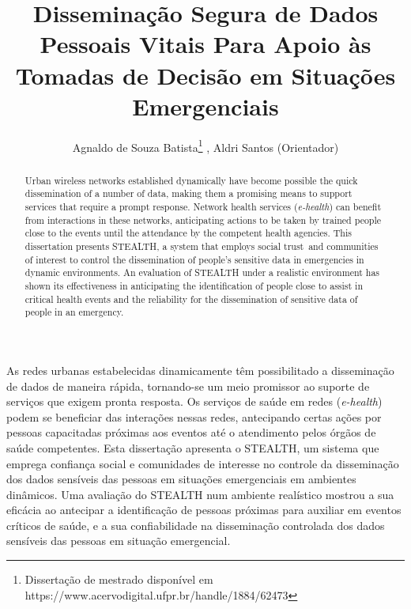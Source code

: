 \documentclass[12pt]{article}
\title{Disseminação Segura de Dados Pessoais Vitais Para Apoio às Tomadas de Decisão em Situações Emergenciais}
\author{Agnaldo de Souza Batista\inst{1}\thanks{{Dissertação de mestrado disponível em https://www.acervodigital.ufpr.br/handle/1884/62473}}\,\,, Aldri Santos\inst{1} (Orientador)}
\newcommand{\agn}[1]{\textcolor{auburn}{#1}}
\begin{document}
 
\pagestyle{myheadings} %
\maketitle

\begin{abstract}
Urban wireless networks established dynamically have become possible the quick dissemination of a number of data, making them a promising means to support services that require a prompt response. Network health services (\textit{e-health})
can benefit from interactions in these networks, 
anticipating
actions to be taken by trained people close to the events until the attendance by the competent health agencies. This dissertation presents \mbox{STEALTH}, a system that employs social trust~and communities of interest to control the dissemination of people's sensitive data in emergencies in dynamic environments. An evaluation of \mbox{STEALTH} under a realistic environment has shown its effectiveness in anticipating the identification of people close to assist in critical health events and the reliability for the dissemination of sensitive data of people in an emergency.

\end{abstract}


\begin{resumo} 

As redes urbanas estabelecidas dinamicamente têm possibilitado a disseminação de dados de maneira rápida, tornando-se um meio promissor ao suporte de serviços que exigem pronta resposta. Os serviços de saúde em redes (\textit{e-health}) 
podem se beneficiar das interações nessas redes, 
\agn{antecipando}
certas ações por pessoas capacitadas próximas aos eventos até o atendimento pelos órgãos de saúde competentes. Esta dissertação apresenta o \mbox{STEALTH}, um sistema que emprega confiança social e comunidades de interesse no controle da disseminação dos dados sensíveis das pessoas em situações emergenciais em ambientes dinâmicos. Uma avaliação do \mbox{STEALTH} num ambiente realístico mostrou a sua eficácia ao antecipar a identificação de pessoas próximas para auxiliar em eventos críticos de saúde, e a sua confiabilidade na disseminação controlada dos dados sensíveis das pessoas em situação emergencial.

\end{resumo}
\end{document}

